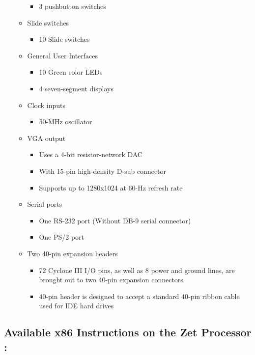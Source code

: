 \documentclass[conference]{IEEEtran}
\begin{document}
\begin{itemize}
\begin{itemize}
		\begin{itemize}
		\item 3 pushbutton switches
		\end{itemize}
	\item Slide switches
		\begin{itemize}
		\item 10 Slide switches
		\end{itemize}
	\item General User Interfaces
		\begin{itemize}
		\item 10 Green color LEDs
		\item 4 seven-segment displays
		\end{itemize}
	\item Clock inputs
		\begin{itemize}
		\item 50-MHz oscillator
		\end{itemize}
	\item VGA output
		\begin{itemize}
		\item Uses a 4-bit resistor-network DAC
		\item With 15-pin high-density D-sub connector
		\item Supports up to 1280x1024 at 60-Hz refresh rate
		\end{itemize}
	\item Serial ports
		\begin{itemize}
		\item One RS-232 port (Without DB-9 serial connector)
		\item One PS/2 port
		\end{itemize}
	\item Two 40-pin expansion headers
		\begin{itemize}
		\item 72 Cyclone III I/O pins, as well as 8 power and ground lines, are brought out to two 40-pin expansion connectors
		\item40-pin header is designed to accept a standard 40-pin ribbon cable used for IDE hard drives 
		\end{itemize}
	\end{itemize}
\end{itemize}

\label{App:AppendixB}
\subsection{Available x86 Instructions on the Zet Processor \cite{ZetStatus}:}
\end{document}
